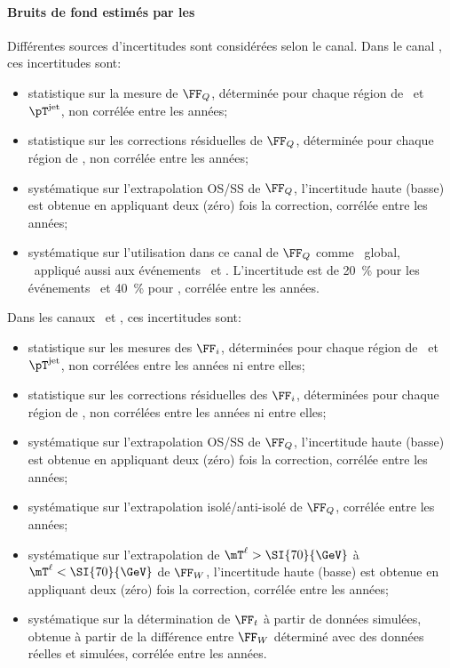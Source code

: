 \paragraph{Bruits de fond estimés par les \fakefactors}
Différentes sources d'incertitudes sont considérées selon le canal.
Dans le canal \tauh\tauh, ces incertitudes sont:
\begin{itemize}
\item statistique sur la mesure de $\FF_Q$, déterminée pour chaque région de \Njets\ et $\pT^{\text{jet}}$, non corrélée entre les années;
\item statistique sur les corrections résiduelles de $\FF_Q$, déterminée pour chaque région de \Njets, non corrélée entre les années;
\item systématique sur l'extrapolation OS/SS de $\FF_Q$, l'incertitude haute (basse) est obtenue en appliquant deux (zéro) fois la correction, corrélée entre les années;
\item systématique sur l'utilisation dans ce canal de $\FF_Q$ comme \FF\ global, \ie\ appliqué aussi aux événements \Wjets\ et \ttbar. L'incertitude est de \SI{20}{\%} pour les événements \Wjets\ et \SI{40}{\%} pour \ttbar, corrélée entre les années.
\end{itemize}
Dans les canaux \mu\tauh\ et \ele\tauh, ces incertitudes sont:
\begin{itemize}
\item statistique sur les mesures des $\FF_i$, déterminées pour chaque région de \Njets\ et $\pT^{\text{jet}}$, non corrélées entre les années ni entre elles;
\item statistique sur les corrections résiduelles des $\FF_i$, déterminées pour chaque région de \Njets, non corrélées entre les années ni entre elles;
\item systématique sur l'extrapolation OS/SS de $\FF_Q$, l'incertitude haute (basse) est obtenue en appliquant deux (zéro) fois la correction, corrélée entre les années;
\item systématique sur l'extrapolation isolé/anti-isolé de $\FF_Q$, corrélée entre les années;
\item systématique sur l'extrapolation de $\mT^{\ell}>\SI{70}{\GeV}$ à $\mT^{\ell}<\SI{70}{\GeV}$ de $\FF_W$, l'incertitude haute (basse) est obtenue en appliquant deux (zéro) fois la correction, corrélée entre les années;
\item systématique sur la détermination de $\FF_t$ à partir de données simulées, obtenue à partir de la différence entre $\FF_W$ déterminé avec des données réelles et simulées, corrélée entre les années.
\end{itemize}

